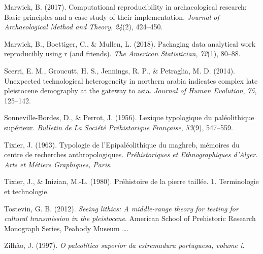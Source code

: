 \documentclass[12pt,twoside]{reedthesis}
\begin{document}
\leavevmode\hypertarget{ref-marwick2017}{}%
Marwick, B. (2017). Computational reproducibility in archaeological research: Basic principles and a case study of their implementation. \emph{Journal of Archaeological Method and Theory}, \emph{24}(2), 424--450.

\leavevmode\hypertarget{ref-marwick2018}{}%
Marwick, B., Boettiger, C., \& Mullen, L. (2018). Packaging data analytical work reproducibly using r (and friends). \emph{The American Statistician}, \emph{72}(1), 80--88.

\leavevmode\hypertarget{ref-scerri2014}{}%
Scerri, E. M., Groucutt, H. S., Jennings, R. P., \& Petraglia, M. D. (2014). Unexpected technological heterogeneity in northern arabia indicates complex late pleistocene demography at the gateway to asia. \emph{Journal of Human Evolution}, \emph{75}, 125--142.

\leavevmode\hypertarget{ref-sonneville-bordes1956}{}%
Sonneville-Bordes, D., \& Perrot, J. (1956). Lexique typologique du paléolithique supérieur. \emph{Bulletin de La Société Préhistorique Française}, \emph{53}(9), 547--559.

\leavevmode\hypertarget{ref-tixier1963}{}%
Tixier, J. (1963). Typologie de l'Epipaléolithique du maghreb, mémoires du centre de recherches anthropologiques. \emph{Préhistoriques et Ethnographiques d'Alger. Arts et Métiers Graphiques, Paris}.

\leavevmode\hypertarget{ref-tixier1980}{}%
Tixier, J., \& Inizian, M.-L. (1980). Préhistoire de la pierre taillée. 1. Terminologie et technologie.

\leavevmode\hypertarget{ref-tostevin2012}{}%
Tostevin, G. B. (2012). \emph{Seeing lithics: A middle-range theory for testing for cultural transmission in the pleistocene}. American School of Prehistoric Research Monograph Series, Peabody Museum \ldots.

\leavevmode\hypertarget{ref-zilhao1997}{}%
Zilhão, J. (1997). \emph{O paleolítico superior da estremadura portuguesa, volume i}.


\end{document}
